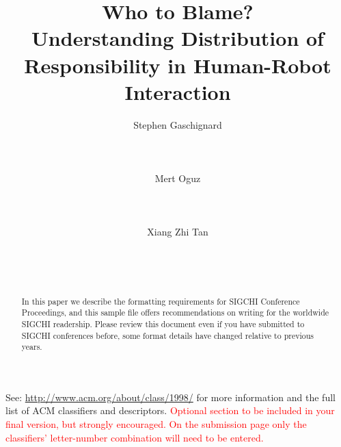 \documentclass{sigchi}
\begin{document}
\title{Who to Blame?\\ Understanding Distribution of Responsibility in Human-Robot Interaction}

\author{
  \alignauthor  Stephen Gaschignard\\
    \\
    \\
    \\
  \alignauthor Mert Oguz\\
    \\
    \\
    \\    
  \alignauthor Xiang Zhi Tan\\
    \\
    \\
    \\
}

\maketitle

\begin{abstract}
In this paper we describe the formatting requirements for
SIGCHI Conference Proceedings, and this sample file
offers recommendations on writing for the worldwide
SIGCHI readership. Please review this document even if
you have submitted to SIGCHI conferences before, some
format details have changed relative to previous years.
\end{abstract}



See: \url{http://www.acm.org/about/class/1998/}
for more information and the full list of ACM classifiers
and descriptors. \newline
\textcolor{red}{Optional section to be included in your final version, 
but strongly encouraged. On the submission page only the classifiers’ 
letter-number combination will need to be entered.}
\end{document}
